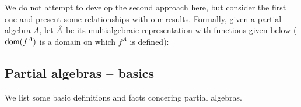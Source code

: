\documentclass[10pt]{article}
\begin{document}
We do not attempt to develop the second approach here, but consider the first one
and present some relationships with our results.
Formally, given a partial algebra $A$, let $\hat{A}$ be its
multialgebraic representation with functions given below ($\mbox{\sf dom}(f^A)$ is
a domain on which $f^A$ is defined):  


\subsection{Partial algebras -- basics}

We list some basic definitions and facts concering partial algebras.

\end{document}

